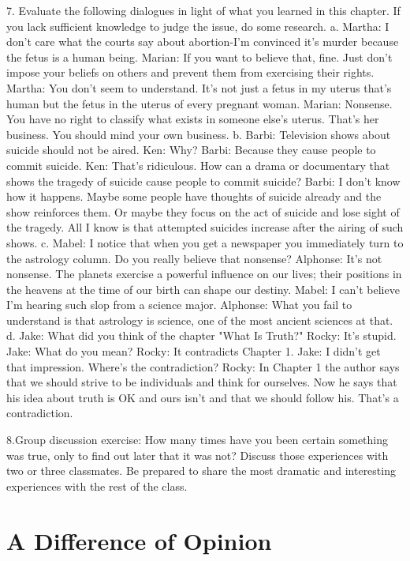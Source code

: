 \documentclass{book}
\begin{document}
7. Evaluate the following dialogues in light of what you learned in this chapter. If you lack sufficient knowledge to judge the issue, do some research. 
a. 
    Martha: I don’t care what the courts say about abortion-I’m convinced it’s murder because the fetus is a human being. 
    Marian: If you want to believe that, fine. Just don’t impose your beliefs on others and prevent them from exercising their rights.
    Martha: You don’t seem to understand. It’s not just a fetus in my uterus that’s human but the fetus in the uterus of every pregnant woman.
    Marian: Nonsense. You have no right to classify what exists in someone else’s uterus. That’s her business. You should mind your own business.
b. 
    Barbi: Television shows about suicide should not be aired.
    Ken: Why?
    Barbi: Because they cause people to commit suicide.
    Ken: That’s ridiculous. How can a drama or documentary that shows the tragedy of suicide cause people to commit suicide?
    Barbi: I don’t know how it happens. Maybe some people have thoughts of suicide already and the show reinforces them. Or maybe they focus on the act of suicide and lose sight of the tragedy. All I know is that attempted suicides increase after the airing of such shows.
c.
    Mabel: I notice that when you get a newspaper you immediately turn to the astrology column. Do you really believe that nonsense?
    Alphonse: It’s not nonsense. The planets exercise a powerful influence on our lives; their positions in the heavens at the time of our birth can shape our destiny.
    Mabel: I can’t believe I’m hearing such slop from a science major.
    Alphonse: What you fail to understand is that astrology is science, one of the most ancient sciences at that.
d.
    Jake: What did you think of the chapter "What Is Truth?"
    Rocky: It’s stupid.
    Jake: What do you mean?
    Rocky: It contradicts Chapter 1.
    Jake: I didn’t get that impression. Where’s the contradiction?
    Rocky: In Chapter 1 the author says that we should strive to be individuals and think for ourselves. Now he says that his idea about truth is OK and ours isn’t and that we should follow his. That’s a contradiction.

8.Group discussion exercise: How many times have you been certain something was true, only to find out later that it was not? Discuss those experiences with two or three classmates. Be prepared to share the most dramatic and interesting experiences with the rest of the class.

\section{A Difference of Opinion}
\end{document}
